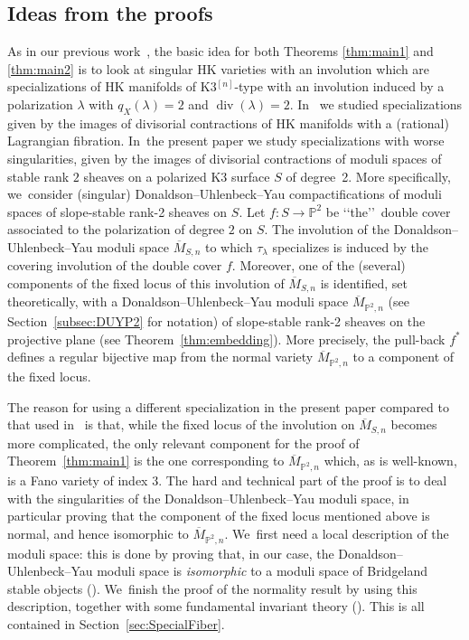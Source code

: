 \documentclass[11pt]{article}
\newcommand{\HK}{\textup{HK}\xspace}
\newcommand{\PP}{{\mathbb P}}\let\P\PP
\DeclareMathOperator{\divisore}{div}\let\div\divisore
\let\ov\overline
\theoremstyle{definition}
\begin{document}
\subsection{Ideas from the proofs}\label{subsec:IntroIdeaProof}

As in our previous work~\cite{involutions1}, the basic idea for both Theorems \ref{thm:main1} and \ref{thm:main2} is to look at singular \HK varieties with an involution which are specializations of \HK manifolds of K3$^{[n]}$-type with an involution induced by a polarization $\lambda$ with $q_X(\lambda)=2$ and $\divisore(\lambda)=2$.
In~\cite{involutions1} we studied specializations given by the images of divisorial contractions of \HK manifolds with a (rational) Lagrangian fibration. In~the present paper we study specializations with worse singularities, given by the images of divisorial contractions of moduli spaces of stable rank $2$ sheaves on a polarized K3 surface $S$ of degree~2.
More specifically, we~consider (singular) Donaldson--Uhlenbeck--Yau compactifications of moduli spaces of slope-stable rank-2 sheaves on $S$. Let $f\colon S\to \PP^2$ be \lq\lq the\rq\rq\ double cover associated to the polarization of degree $2$ on $S$.
The involution of the Donaldson--Uhlenbeck--Yau moduli space $\ov{M}_{S,n}$ to which $\tau_\lambda$ specializes is induced by the covering involution of the double cover $f$.
Moreover, one of the (several) components of the fixed locus of this involution of $\ov{M}_{S,n}$ is identified, set theoretically, with a Donaldson--Uhlenbeck--Yau moduli space $\ov{M}_{\PP^2,n}$ (see Section~\ref{subsec:DUYP2} for notation) of slope-stable rank-2 sheaves on the projective plane (see Theorem~\ref{thm:embedding}).
More precisely, the pull-back $f^{*}$ defines a regular bijective map from the normal variety $\ov{M}_{\PP^2,n}$ to a component of the fixed locus.

The reason for using a different specialization in the present paper compared to that used in~\cite{involutions1} is that, while the fixed locus of the involution on $\ov{M}_{S,n}$ becomes more complicated, the only relevant component for the proof of Theorem~\ref{thm:main1} is the one corresponding to $\ov{M}_{\PP^2,n}$ which, as is well-known, is a Fano variety of index $3$.
The hard and technical part of the proof is to deal with the singularities of the Donaldson--Uhlenbeck--Yau moduli space, in particular proving that the component of the fixed locus mentioned above is normal, and hence isomorphic to $\ov{M}_{\PP^2,n}$. We~first need a local description of the moduli space: this is done by proving that, in our case, the Donaldson--Uhlenbeck--Yau moduli space is \emph{isomorphic} to a moduli space of Bridgeland stable objects (\cite{Bridgeland:Stab,Tajakka:Uhlenbeck}). We~finish the proof of the normality result by using this description, together with some fundamental invariant theory (\cite{procesi:invariants}).
This is all contained in Section~\ref{sec:SpecialFiber}.
\end{document}
